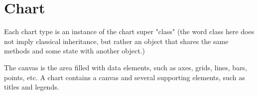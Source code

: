 \section{Chart}
Each chart type is an instance of the chart super "class" (the word class here does not imply classical inheritance, but rather an object that shares the same methods and some state with another object.)

The canvas is the area filled with data elements, such as axes, grids, lines, bars, points, etc. A chart contains a canvas and several supporting elements, such as titles and legends.
